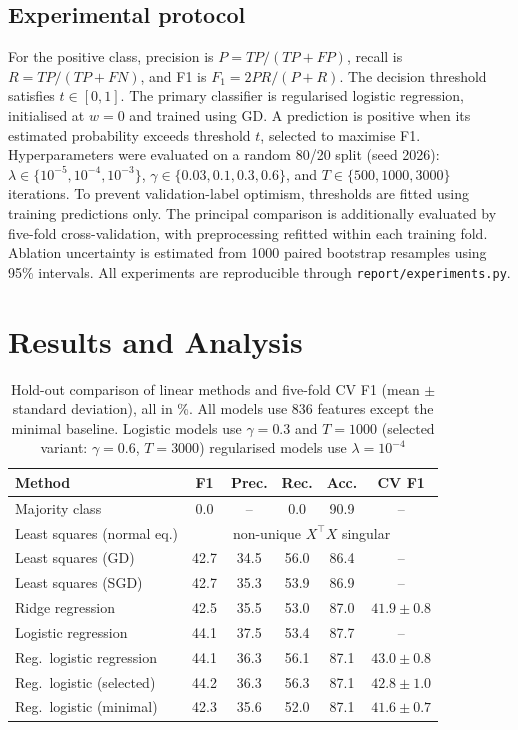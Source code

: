\documentclass[10pt,conference]{IEEEtran}
\newcommand{\cvMin}{$41.6\pm0.7$}
\newcommand{\cvRidge}{$41.9\pm0.8$}
\newcommand{\cvFull}{$43.0\pm0.8$}
\newcommand{\cvSel}{$42.8\pm1.0$}
\begin{document}
\subsection{Experimental protocol}
For the positive class, precision is $P=TP/(TP+FP)$, recall is
$R=TP/(TP+FN)$, and F1 is $F_1=2PR/(P+R)$. The decision threshold
satisfies $t\in[0,1]$.
The primary classifier is regularised logistic regression, initialised
at $w=0$ and trained using GD. A prediction is positive when its
estimated probability exceeds threshold $t$, selected to maximise F1.
Hyperparameters were evaluated on a random 80/20 split (seed 2026):
$\lambda\in\{10^{-5},10^{-4},10^{-3}\}$,
$\gamma\in\{0.03,0.1,0.3,0.6\}$, and
$T\in\{500,1000,3000\}$ iterations. To prevent validation-label
optimism, thresholds are fitted using training predictions only. The
principal comparison is additionally evaluated by five-fold
cross-validation, with preprocessing refitted within each training fold.
Ablation uncertainty is estimated from 1000 paired bootstrap resamples
using 95\% intervals. All experiments are reproducible through
\texttt{report/experiments.py}.

\section{Results and Analysis}

\begin{table}[tbp]
\centering
\caption{Hold-out comparison of linear methods and five-fold CV
F1 (mean $\pm$ standard deviation), all in \%. All models use 836
features except the minimal baseline. Logistic models use $\gamma=0.3$
and $T=1000$ (selected variant: $\gamma=0.6$, $T=3000$) regularised
models use $\lambda=10^{-4}$}
\label{tab:methods}
\footnotesize
\setlength{\tabcolsep}{3.5pt}
\begin{tabular}{@{}lccccc@{}}
\toprule
Method & F1 & Prec. & Rec. & Acc. & CV F1\\
\midrule
Majority class                & 0.0  & --   & 0.0  & 90.9 & --\\
Least squares (normal eq.)    & \multicolumn{5}{c}{non-unique $X^\top X$ singular}\\
Least squares (GD)            & 42.7 & 34.5 & 56.0 & 86.4 & --\\
Least squares (SGD)           & 42.7 & 35.3 & 53.9 & 86.9 & --\\
Ridge regression              & 42.5 & 35.5 & 53.0 & 87.0 & \cvRidge\\
Logistic regression           & 44.1 & 37.5 & 53.4 & 87.7 & --\\
Reg.\ logistic regression     & 44.1 & 36.3 & 56.1 & 87.1 & \cvFull\\
Reg.\ logistic (selected)     & 44.2 & 36.3 & 56.3 & 87.1 & \cvSel\\
\midrule
Reg.\ logistic (minimal)      & 42.3 & 35.6 & 52.0 & 87.1 & \cvMin\\
\bottomrule
\end{tabular}
\end{table}
\end{document}
